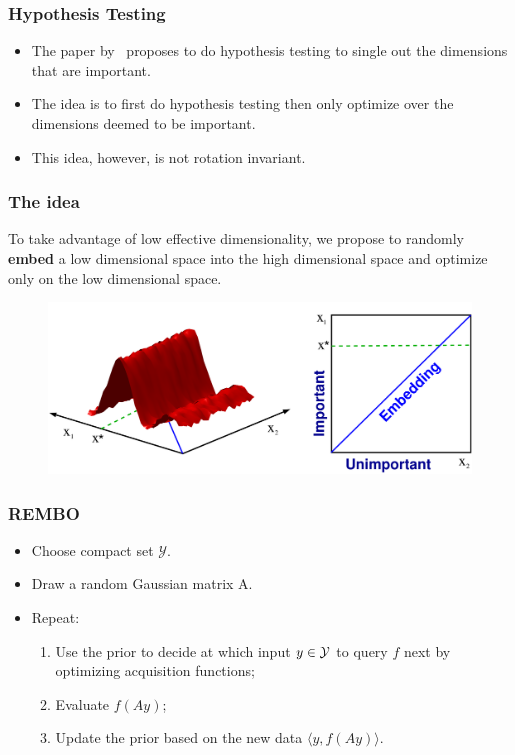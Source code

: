 \documentclass[grey]{beamer}
\begin{document}
  \begin{frame}
  \frametitle{Hypothesis Testing}
  \begin{itemize}
   \item The paper by~\protect\cite{Chen:2012} proposes to do hypothesis testing to 
   single out the dimensions that are important. 
   \item The idea is to first do hypothesis testing then only optimize over the 
   dimensions deemed to be important.
   \item This idea, however, is not rotation invariant.
  \end{itemize}

   
  \end{frame}

  
 \begin{frame}
  \frametitle{The idea}
  To take advantage of low effective dimensionality, we propose to 
  randomly {\bf \textcolor{myColor}{embed}} 
  a low dimensional space into the high dimensional space and optimize
  only on the low dimensional space.
  \begin{figure}[t]
   \includegraphics[width = 0.9\columnwidth]
   {../paper/figures/2to1embedding}
   \label{fig:ESSL_BLR}
  \end{figure}
 \end{frame}
 
 \begin{frame}
  \frametitle{REMBO}
  \begin{itemize}
   \item Choose compact set {\bf \textcolor{myColor}{$\mathcal{Y}$}}.
   \item Draw a random Gaussian matrix A.
   \item Repeat:
   \begin{enumerate}
    \item Use the prior to decide at which input $y \in \cal Y$ to query $f$ next
    by optimizing acquisition functions;
    \item Evaluate {\bf \textcolor{myColor}{$f(Ay)$}};
    \item Update the prior based on the new data 
    {\bf \textcolor{myColor}{$\langle{}y, f(Ay)\rangle$}}.
   \end{enumerate}
  \end{itemize}
 \end{frame}
\end{document}
